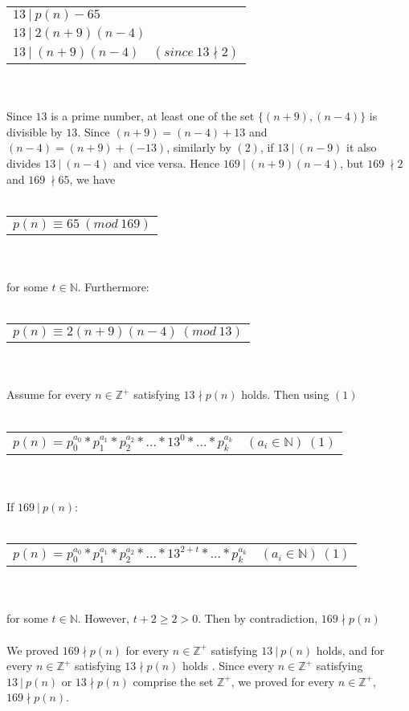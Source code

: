 \documentclass[12pt]{article}
\begin{document}
\begin{tabular}{l}
    $13\ |\ p(n)-65$\\
    $13\ |\ 2(n+9)(n-4)$\\
    $13\ |\ (n+9)(n-4) \quad (since\ 13 \nmid 2)$
\end{tabular}
\\ \\
Since $13$ is a prime number, at least one of the set $\{(n+9),(n-4)\}$ is divisible by $13$.
Since $(n+9)=(n-4)+13$ and $(n-4)=(n+9)+(-13)$, similarly by $(2)$, if $13\ |\ (n-9)$ it also divides $13\ |\ (n-4)$ and
vice versa. Hence $169\ |\ (n+9)(n-4)$, but $169\ \nmid 2$ and $169\ \nmid 65$, we have
\\ \\
\begin{tabular}{l}
    $p(n)\equiv 65\ (mod\ 169)$\\
\end{tabular}
\\ \\
for some $t \in \mathbb{N}$. Furthermore:
\\ \\
\begin{tabular}{l}
    $p(n) \equiv 2(n+9)(n-4)\ (mod\ 13)$\\
\end{tabular}
\\ \\
Assume for every $n \in \mathbb{Z^+}$ satisfying $13 \nmid p(n)$ holds. Then using $(1)$
\\ \\
\begin{tabular}{l}
    $p(n)=p_0^{a_0}*p_1^{a_1}*p_2^{a_2}*...*13^{0}*...*p_k^{a_k} \quad (a_i \in \mathbb{N})\ (1)$\\
\end{tabular}
\\ \\
If $169\ |\ p(n)$:
\\ \\
\begin{tabular}{l}
    $p(n)=p_0^{a_0}*p_1^{a_1}*p_2^{a_2}*...*13^{2+t}*...*p_k^{a_k} \quad (a_i \in \mathbb{N})\ (1)$\\
\end{tabular}
\\ \\
for some $t \in \mathbb{N}$. However, $t+2\geq 2 > 0$. Then by contradiction, $169\nmid  p(n)$
\\ \\
We proved $169\nmid p(n)$ for every $n \in \mathbb{Z^+}$ satisfying $13\ |\ p(n)$ holds, and 
for every $n \in \mathbb{Z^+}$ satisfying $13 \nmid p(n)$ holds .
Since every $n \in \mathbb{Z^+}$ satisfying $13\ |\ p(n)$ or $13 \nmid p(n)$ comprise the set 
$\mathbb{Z^+}$, we proved for every $n \in \mathbb{Z^+}$, $169\nmid p(n)$.
\\ \\
\end{document}
